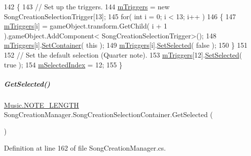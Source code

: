 \begin{DoxyCode}
142         \{
143             \textcolor{comment}{// Set up the triggers.}
144             \hyperlink{group___s_c_m_nest_class_aeda161975a8a683281b9388b2c905ae8}{mTriggers} = \textcolor{keyword}{new} SongCreationSelectionTrigger[13];
145             \textcolor{keywordflow}{for}( \textcolor{keywordtype}{int} i = 0; i < 13; i++ )
146             \{
147                 \hyperlink{group___s_c_m_nest_class_aeda161975a8a683281b9388b2c905ae8}{mTriggers}[i] = gameObject.transform.GetChild( i + 1 ).gameObject.AddComponent<
      SongCreationSelectionTrigger>();
148                 \hyperlink{group___s_c_m_nest_class_aeda161975a8a683281b9388b2c905ae8}{mTriggers}[i].\hyperlink{group___s_c_m_nest_class_a29f496763424eb274f35cd29330583ac}{SetContainer}( \textcolor{keyword}{this} );
149                 \hyperlink{group___s_c_m_nest_class_aeda161975a8a683281b9388b2c905ae8}{mTriggers}[i].\hyperlink{group___s_c_m_nest_class_a0d65cd109a370034f580d63e823725b9}{SetSelected}( \textcolor{keyword}{false} );
150             \}
151 
152             \textcolor{comment}{// Set the default selection (Quarter note).}
153             \hyperlink{group___s_c_m_nest_class_aeda161975a8a683281b9388b2c905ae8}{mTriggers}[12].\hyperlink{group___s_c_m_nest_class_a0d65cd109a370034f580d63e823725b9}{SetSelected}( \textcolor{keyword}{true} );
154             \hyperlink{group___s_c_m_nest_class_a1684b25b3eb0e87f189996de22bf9792}{mSelectedIndex} = 12;
155         \}
\end{DoxyCode}
\mbox{\label{group___s_c_m_nest_class_ae73f2b2c2f567ecaf6ce10f85c30956a}} 
\subparagraph{\texorpdfstring{Get\+Selected()}{GetSelected()}}
{\footnotesize\ttfamily \hyperlink{group___music_enums_gaf11b5f079adbb21c800b9eca1c5c3cbd}{Music.\+N\+O\+T\+E\+\_\+\+L\+E\+N\+G\+TH} Song\+Creation\+Manager.\+Song\+Creation\+Selection\+Container.\+Get\+Selected (\begin{DoxyParamCaption}{ }\end{DoxyParamCaption})}



Definition at line 162 of file Song\+Creation\+Manager.\+cs.



